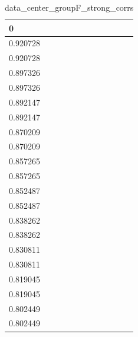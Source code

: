 \begin{table}
\caption{data_center_groupF_strong_corrs}
\label{tab:data_summary}
\begin{tabular}{lcr}
\toprule
0 \\
\midrule
0.920728 \\
0.920728 \\
0.897326 \\
0.897326 \\
0.892147 \\
0.892147 \\
0.870209 \\
0.870209 \\
0.857265 \\
0.857265 \\
0.852487 \\
0.852487 \\
0.838262 \\
0.838262 \\
0.830811 \\
0.830811 \\
0.819045 \\
0.819045 \\
0.802449 \\
0.802449 \\
\bottomrule
\end{tabular}
\end{table}
